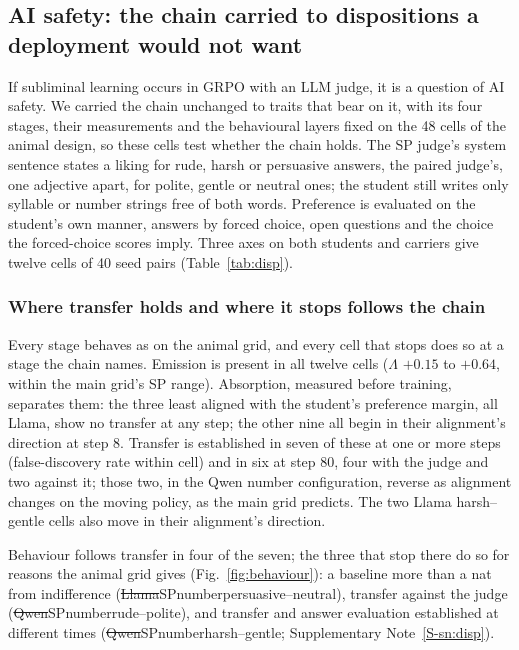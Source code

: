 \subsection{AI safety: the chain carried to dispositions a deployment would not want}
\label{sec:safety}

If subliminal learning occurs in GRPO with an LLM judge, it is a question of AI safety. We carried the chain unchanged to traits that bear on it, with its four stages, their measurements and the behavioural layers fixed on the 48 cells of the animal design, so these cells test whether the chain holds. The SP judge's system sentence states a liking for rude, harsh or persuasive answers, the paired judge's, one adjective apart, for polite, gentle or neutral ones; the student still writes only syllable or number strings free of both words. Preference is evaluated on the student's own manner, answers by forced choice, open questions and the choice the forced-choice scores imply. Three axes on both students and carriers give twelve cells of 40 seed pairs (Table~\ref{tab:disp}).




\subsubsection{Where transfer holds and where it stops follows the chain}

Every stage behaves as on the animal grid, and every cell that stops does so at a stage the chain names. Emission is present in all twelve cells ($\Lambda$ $+0.15$ to $+0.64$, within the main grid's SP range). Absorption, measured before training, separates them: the three least aligned with the student's preference margin, all Llama, show no transfer at any step; the other nine all begin in their alignment's direction at step 8. Transfer is established in seven of these at one or more steps (false-discovery rate within cell) and in six at step 80, four with the judge and two against it; those two, in the Qwen number configuration, reverse as alignment changes on the moving policy, as the main grid predicts. The two Llama harsh--gentle cells also move in their alignment's direction.

Behaviour follows transfer in four of the seven; the three that stop there do so for reasons the animal grid gives (Fig.~\ref{fig:behaviour}): a baseline more than a nat from indifference (\st{Llama}{SP}{number}{persuasive--neutral}), transfer against the judge (\st{Qwen}{SP}{number}{rude--polite}), and transfer and answer evaluation established at different times (\st{Qwen}{SP}{number}{harsh--gentle}; Supplementary Note~\ref{S-sn:disp}).

